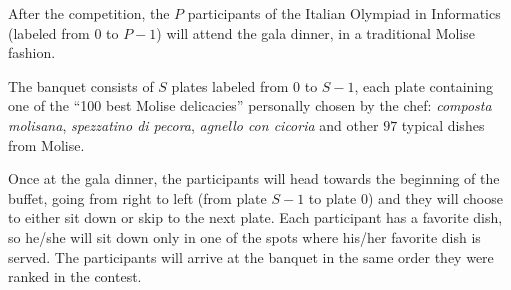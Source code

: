 \usepackage{xcolor}
\usepackage{afterpage}
\usepackage{pifont,mdframed}
\usepackage[bottom]{footmisc}
\usepackage{multicol}


\renewcommand{\inputfile}{\texttt{stdin}}
\renewcommand{\outputfile}{\texttt{stdout}}
\makeatletter
\renewcommand{\this@inputfilename}{\texttt{stdin}}
\renewcommand{\this@outputfilename}{\texttt{stdout}}
\makeatother

\newenvironment{warning}
  {\par\begin{mdframed}[linewidth=2pt,linecolor=gray]%
    \begin{list}{}{\leftmargin=1cm
                   \labelwidth=\leftmargin}\item[\Large\ding{43}]}
  {\end{list}\end{mdframed}\par}
\newenvironment{danger}
{\par\begin{mdframed}[linewidth=2pt,linecolor=red!60!yellow,backgroundcolor=red!20!white]%
		\begin{list}{}{\leftmargin=1cm
				\labelwidth=\leftmargin}\item[\Large\ding{45}]}
		{\end{list}\end{mdframed}\par}


After the competition, the $P$ participants of the Italian Olympiad in
Informatics (labeled from $0$ to $P-1$) will attend the gala dinner, in
a traditional Molise fashion.

The banquet consists of $S$ plates labeled from $0$ to $S-1$, each plate
containing one of the ``100 best Molise delicacies'' personally chosen by the
chef: \emph{composta molisana}, \emph{spezzatino di pecora},
\emph{agnello con cicoria} and other $97$ typical dishes from Molise.

Once at the gala dinner, the participants will head towards the beginning of the
buffet, going from right to left (from plate $S-1$ to plate $0$) and
they will choose to either sit down or skip to the next plate. Each participant
has a favorite dish, so he/she will sit down only in one of the spots where
his/her favorite dish is served. The participants will arrive at the banquet in
the same order they were ranked in the contest.

